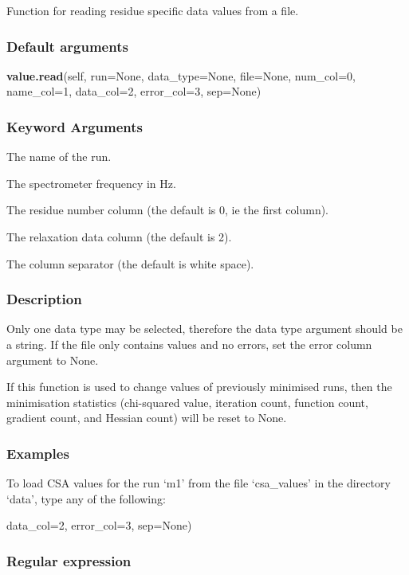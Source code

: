 Function for reading residue specific data values from a file.

\subsubsection{Default arguments}

\textsf{\textbf{value.read}(self, run=None, data\_type=None, file=None, num\_col=0, name\_col=1, data\_col=2, error\_col=3, sep=None)}


\subsubsection{Keyword Arguments}

  The name of the run.

  The spectrometer frequency in Hz.

  The residue number column (the default is 0, ie the first column).

  The relaxation data column (the default is 2).

  The column separator (the default is white space).

\subsubsection{Description}

Only one data type may be selected, therefore the data type argument should be a string.  If
the file only contains values and no errors, set the error column argument to None.

If this function is used to change values of previously minimised runs, then the
minimisation statistics (chi-squared value, iteration count, function count, gradient count,
and Hessian count) will be reset to None.


\subsubsection{Examples}

To load CSA values for the run `m1' from the file `csa\_values' in the directory `data', type
any of the following:


                  data\_col=2, error\_col=3, sep=None)




\subsubsection{Regular expression}

